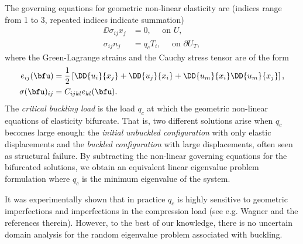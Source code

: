 

The governing equations for geometric non-linear elasticity are (indices range from 1 to 3, repeated indices indicate summation)
\begin{align*}
   \DD{\sigma_{ij}}{x_j} &= 0 , \quad \text{ on }  U,\\
   \sigma_{ij} n_j &=   q_c T_i, \quad  \text{ on } \partial U_T,
\end{align*}
where the Green-Lagrange strains and the Cauchy stress tensor are of the form
\begin{align*}
    e_{ij} (\bfu )&=  \frac  1 2 \left [ \DD{u_i}{x_j} +   \DD{u_j}{x_i}  +  \DD{u_m}{x_i}\DD{u_m}{x_j}\right], \\
\sigma(\bfu)_{ij} &= C_{ijkl} e_{kl}(\bfu ).
\end{align*}
The \emph{critical buckling load} is the load $q_c$ at which the geometric non-linear equations of elasticity bifurcate. 
That is, two different solutions arise when $q_c$ becomes large enough:
the \emph{ initial unbuckled configuration} with only elastic displacements and the \emph{buckled configuration} with large displacements, often seen as structural failure. By subtracting the non-linear governing equations for the bifurcated solutions, we obtain an equivalent linear eigenvalue problem formulation where $q_c$ is the minimum eigenvalue of the system.

It was experimentally shown that in practice $q_c$ is highly sensitive to geometric imperfections and imperfections in the compression load (see e.g. Wagner \cite{WAGNER2020106451} and the references therein). However, to the best of our knowledge, there is no uncertain domain analysis for the random eigenvalue problem associated with buckling.



